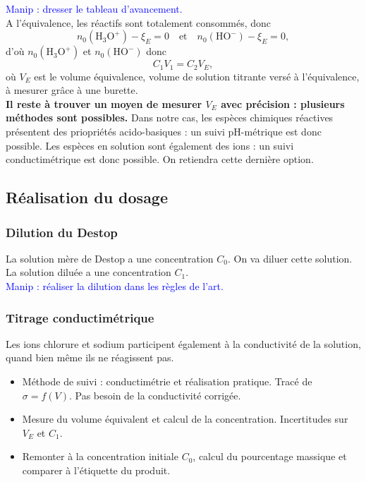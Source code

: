 \documentclass[11pt,a4paper]{report}
\begin{document}
\textcolor{blue}{Manip : dresser le tableau d'avancement.}\\

A l'équivalence, les réactifs sont totalement consommés, donc 
\begin{equation}
	n_0(\text{H}_3\text{O}^+) - \xi_E = 0 \quad\text{et}\quad n_0(\text{HO}^-) - \xi_E = 0,
\end{equation}
d'où $n_0(\text{H}_3\text{O}^+)$ et $n_0(\text{HO}^-)$ donc
\begin{equation}
	C_1 V_1 = C_2 V_E,	
\end{equation}
où $V_E$ est le volume équivalence, volume de solution titrante versé à l'équivalence, à mesurer grâce à une burette.\\

\textbf{Il reste à trouver un moyen de mesurer $V_E$ avec précision : plusieurs méthodes sont possibles.} Dans notre cas, les espèces chimiques réactives présentent des priopriétés acido-basiques : un suivi pH-métrique est donc possible. Les espèces en solution sont également des ions : un suivi conductimétrique est donc possible. On retiendra cette dernière option.

\subsection{Réalisation du dosage}
\subsubsection{Dilution du Destop}

La solution mère de Destop a une concentration $C_0$. On va diluer cette solution. La solution diluée a une concentration $C_1$.\\

\textcolor{blue}{Manip : réaliser la dilution dans les règles de l'art.}

\subsubsection{Titrage conductimétrique}

Les ions chlorure et sodium participent également à la conductivité de la solution, quand bien même ils ne réagissent pas.\\	

\begin{itemize}
	\item Méthode de suivi : conductimétrie et réalisation pratique. 
		Tracé de $\sigma = f(V)$. Pas besoin de la conductivité corrigée.
	\item Mesure du volume équivalent et calcul de la concentration. 
		Incertitudes sur $V_E$ et $C_1$.
	\item Remonter à la concentration initiale $C_0$, 
		calcul du pourcentage massique et comparer à l'étiquette du produit.
\end{itemize}
\end{document}
